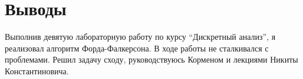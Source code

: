 \section{Выводы}
Выполнив девятую лабораторную работу по курсу \enquote{Дискретный анализ}, я реализовал алгоритм Форда-Фалкерсона. 
В ходе работы не сталкивался с проблемами. Решил задачу сходу, руководствуюсь Корменом и лекциями Никиты Константиновича.
\pagebreak
